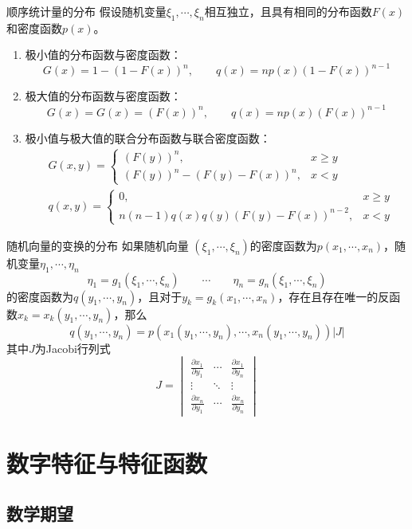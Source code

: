 \documentclass[lang = cn, scheme = chinese, thmcnt = section]{elegantbook}
\begin{document}
\begin{proposition}{顺序统计量的分布}
	假设随机变量$\xi_1,\cdots,\xi_n$相互独立，且具有相同的分布函数$F(x)$和密度函数$p(x)$。
	\begin{enumerate}
		\item 极小值的分布函数与密度函数：%
		$$
		G(x)=1-(1-F(x))^n,\qquad q(x)=np(x)(1-F(x))^{n-1}
		$$
		\item 极大值的分布函数与密度函数：
		$$
		G(x)=G(x)=(F(x))^n,\qquad q(x)=np(x)(F(x))^{n-1}
		$$
		\item 极小值与极大值的联合分布函数与联合密度函数：%
		\begin{align*}
			&G(x,y)=\begin{cases}
				(F(y))^n,&x\ge y\\
				(F(y))^n-(F(y)-F(x))^n,&x<y
			\end{cases}\\
			&q(x,y)=\begin{cases}
				0,&x\ge y\\
				n(n-1)q(x)q(y)(F(y)-F(x))^{n-2},&x<y
			\end{cases}
		\end{align*}
	\end{enumerate}
\end{proposition}

\begin{theorem}{随机向量的变换的分布}
	如果随机向量 $(\xi_1,\cdots,\xi_n)$的密度函数为$p(x_1,\cdots,x_n)$，随机变量$\eta_1,\cdots,\eta_n$
	$$
	\eta_1=g_1(\xi_1,\cdots,\xi_n)\qquad \cdots
	\qquad \eta_n=g_n(\xi_1,\cdots,\xi_n)
	$$
	的密度函数为$q(y_1,\cdots,y_n)$，且对于$y_k=g_k(x_1,\cdots,x_n)$，存在且存在唯一的反函数$x_k=x_k(y_1,\cdots,y_n)$，那么
	$$
	q(y_1,\cdots,y_n)=p(x_1(y_1,\cdots,y_n),\cdots,x_n(y_1,\cdots,y_n))|J|
	$$
	其中$J$为Jacobi行列式
	$$
	J=\begin{vmatrix}
		\frac{\partial x_1}{\partial y_1}&\cdots&\frac{\partial x_1}{\partial y_n}\\
		\vdots&\ddots&\vdots\\
		\frac{\partial x_n}{\partial y_1}&\cdots&\frac{\partial x_n}{\partial y_n}
	\end{vmatrix}
	$$
\end{theorem}

\chapter{数字特征与特征函数}

\section{数学期望}
\end{document}
